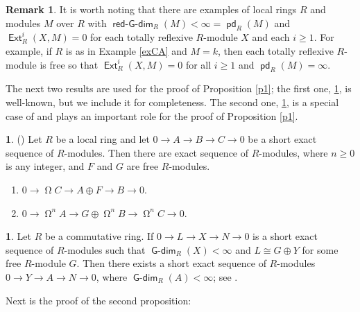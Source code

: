 \documentclass{amsart}
\theoremstyle{plain} %
\theoremstyle{definition}
\newtheorem{chunk}[thm]{\hspace*{-1.065ex}\bf}
\newtheorem{rmk}[thm]{Remark}
\def\Ext{\operatorname{\mathsf{Ext}}}
\def\pd{\operatorname{\mathsf{pd}}}
\DeclareMathOperator{\Gdim}{\mathsf{G-dim}}
\DeclareMathOperator{\rGdim}{\operatorname{\mathsf{red-G-dim}}}
\DeclareMathOperator{\syz}{\Omega}
\begin{document}
\begin{rmk} It is worth noting that there are examples of local rings $R$ and modules $M$ over $R$ with $\rGdim_R(M)<\infty=\pd_R(M)$ and $\Ext^i_R(X, M)=0$ for each totally reflexive $R$-module $X$ and each $i\geq 1$. For example, if $R$ is as in Example \ref{exCA} and $M=k$, then each totally reflexive $R$-module is free so that $\Ext^i_R(X, M)=0$ for all $i\geq 1$ and $\pd_R(M)=\infty$. 
\end{rmk}
\vspace{-0.1in}

The next two results are used for the proof of Proposition \ref{p1}; the first one, \ref{R1}, is well-known, but we include it for completeness. The second one, \ref{Tak}, is a special case of \cite[3.1]{Taksyz} and plays an important role for the proof of Proposition \ref{p1}.

\begin{chunk} \label{R1} (\cite[2.2]{DaoTak}) Let $R$ be a local ring and let $0\to A\to B\to C \to 0$ be a short exact sequence of $R$-modules. Then there are exact sequence of $R$-modules, where $n\geq 0$ is any integer, and $F$ and $G$ are free $R$-modules.
\begin{enumerate}[\rm(i)]
\item $0 \to \syz C \to A\oplus F \to B \to 0$.
\item $0 \to \syz^n A \to G \oplus \syz^n B \to \syz^n C \to 0$.
\end{enumerate}
\end{chunk}

\begin{chunk} \label{Tak} Let $R$ be a commutative ring. If $0 \to L \to X \to N \to 0$ is a short exact sequence of $R$-modules such that $\Gdim_R(X)<\infty$ and $L\cong G \oplus Y$ for some free $R$-module $G$. Then there exists a short exact sequence of $R$-modules $0 \to Y \to A \to N \to 0$, where $\Gdim_R(A)<\infty$; see \cite[3.1]{Taksyz}.
\end{chunk}
\vspace{-0.1in}

Next is the proof of the second proposition:
\end{document}
